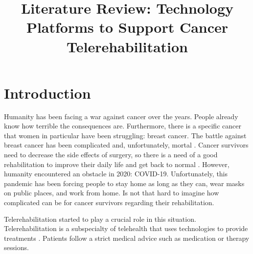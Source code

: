 \documentclass[conference]{IEEEtran}
\begin{document}
\title{Literature Review: Technology Platforms to Support Cancer Telerehabilitation}

\author{
}

\maketitle



\section{Introduction}
Humanity has been facing a war against cancer over the years. People already know how terrible the consequences are. Furthermore, there is a specific cancer that women in particular have been struggling: breast cancer. The battle against breast cancer has been complicated and, unfortunately, mortal \cite{burbank_knowledge_2006}. Cancer survivors need to decrease the side effects of surgery, so there is a need of a good rehabilitation to improve their daily life and get back to normal \cite{de_rezende_telerehabilitation_2021}. However, humanity encountered an obstacle in 2020: COVID-19. Unfortunately, this pandemic has been forcing people to stay home as long as they can, wear masks on public places, and work from home. Is not that hard to imagine how complicated can be for cancer survivors regarding their rehabilitation.

Telerehabilitation started to play a crucial role in this situation. Telerehabilitation is a subspecialty of telehealth that uses technologies to provide treatments \cite{galiano-castillo_agreement_2014, van_der_linden_feasibility_2018}. Patients follow a strict medical advice such as medication or therapy sessions.  
\end{document}
